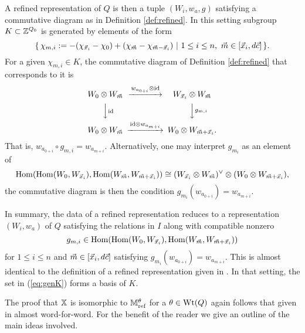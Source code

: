 \documentclass[12pt]{amsart}
\newcommand{\Wt}{\textup{Wt}}
\begin{document}
A refined representation of $Q$ is then a tuple $(W_i, w_a,g)$ satisfying a commutative diagram as in Definition \ref{def:refined}. In this setting subgroup $K \subset \mathbb{Z}^{Q_0}$ is generated by elements of the form \begin{equation}\label{eq:genK}
\{\,\chi_{m,i}:= - (\chi_{{\vec{x}}_i} - \chi_0) + (\chi_{{\vec{m}}} - \chi_{{\vec{m}}-{\vec{x}}_i})\,\, | \,\, 1\leq i\leq n,\, \, {\vec{m}}  \in [{\vec{x}}_i,d{\vec{c}}]\,\}.
\end{equation}
For a given $\chi_{m,i} \in K$, the commutative diagram of Definition \ref{def:refined} that corresponds to it is
\begin{equation}\label{CD:HIMO}
\begin{CD}
W_0 \otimes W_{\vecm} @>w_{a_{0+i}} \otimes \text{id}>> W_{\vecx_i} \otimes W_{\vecm}\\
@VV\text{id}V @VVg_{m,i}V\\
W_0 \otimes W_{\vecm} @>\text{id} \otimes w_{a_{m+i}}>> W_{0} \otimes W_{\vecm + \vecx_i}.
\end{CD}
\end{equation}
That is, $w_{a_{0+i}} \circ g_{m,i} = w_{a_{m+i}}$. Alternatively, one may interpret $g_{m_i}$ as an element of $$\operatorname{Hom}(\operatorname{Hom}(W_0, W_{{\vec{x}}_i}),\operatorname{Hom}(W_{{\vec{m}}},W_{{\vec{m}} + {\vec{x}}_i})) \cong (W_{{\vec{x}}_i} \otimes W_{{\vec{m}}})^\vee \otimes (W_{0} \otimes W_{{\vec{m}} + {\vec{x}}_i}),$$ the commutative diagram is then the condition $g_{m_i}(w_{a_{0+i}}) = w_{a_{m+i}}$.

In summary, the data of a refined representation reduces to a representation $(W_i, w_a)$ of $Q$ satisfying the relations in $I$ along with compatible nonzero $$g_{m,i} \in \operatorname{Hom}(\operatorname{Hom}(W_0, W_{{\vec{x}}_i}),\operatorname{Hom}(W_{{\vec{m}}},W_{{\vec{m}} + {\vec{x}}_i}))$$ for $1\leq i \leq n$ and ${\vec{m}} \in [{\vec{x}}_i, d{\vec{c}}]$ satisfying $g_{m_i}(w_{a_{0+i}}) = w_{a_{m+i}}$. This is almost identical to the definition of a refined representation given in \cite[Definition 3.1]{AU}. In that setting, the set in (\ref{eq:genK}) forms a basis of $K$.

The proof that $\mathbb{X}$ is isomorphic to $\mathbb{M}_{\text{ref}}^\theta$ for a $\theta \in \Wt(Q)$ again follows that given in \cite[Proof of Theorem 1.1]{AU} almost word-for-word. 
For the benefit of the reader we give an outline of the main ideas involved.
\end{document}
